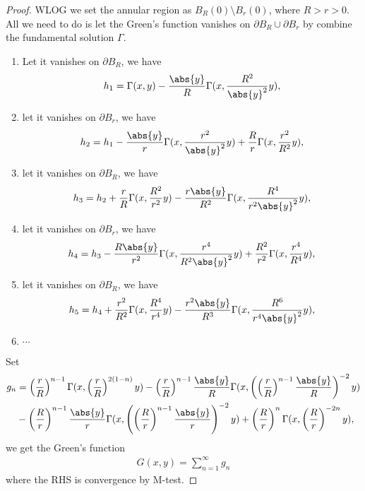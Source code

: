 \documentclass[a4paper]{article}
\DeclarePairedDelimiter{\abs}\lvert\rvert
\begin{document}
\begin{proof}
WLOG we set the annular region as $B_{R}(0)\setminus B_r(0)$, where $R>r>0$.
All we need to do is let the Green's function vanishes on $\partial B_R\cup\partial B_r$
by combine the fundamental solution $\Gamma$.
\begin{enumerate}
\item Let it vanishes on $\partial B_R$, we have
\begin{align*}
h_1 = \Gamma(x,y) - \frac{\abs{y}}{R}\Gamma(x,\frac{R^2}{\abs{y}^2}y),
\end{align*}
\item let it vanishes on $\partial B_r$, we have
\begin{align*}
h_2 = h_1 - \frac{\abs{y}}{r}\Gamma(x,\frac{r^2}{\abs{y}^2}y) + \frac{R}{r}\Gamma(x,\frac{r^2}{R^2}y),
\end{align*}
\item let it vanishes on $\partial B_R$, we have
\begin{align*}
h_3 = h_2 + \frac{r}{R}\Gamma(x,\frac{R^2}{r^2}y) - \frac{r\abs{y}}{R^2}\Gamma(x,\frac{R^4}{r^2\abs{y}^2}y),
\end{align*}
\item let it vanishes on $\partial B_r$, we have
\begin{align*}
h_4 = h_3 - \frac{R\abs{y}}{r^2}\Gamma(x,\frac{r^4}{R^2\abs{y}^2}y) + \frac{R^2}{r^2}\Gamma(x,\frac{r^4}{R^4}y),
\end{align*}
\item let it vanishes on $\partial B_R$, we have
\begin{align*}
h_5 = h_4 + \frac{r^2}{R^2}\Gamma(x,\frac{R^4}{r^4}y) - \frac{r^2\abs{y}}{R^3}\Gamma(x,\frac{R^6}{r^4\abs{y}^2}y),
\end{align*}
\item $\cdots$
\end{enumerate}
Set
\begin{align*}
g_n &= \left(\frac{r}{R}\right)^{n-1}\Gamma(x,\left(\frac{r}{R}\right)^{2(1-n)}y)
- \left(\frac{r}{R}\right)^{n-1}\frac{\abs{y}}{R}\Gamma(x, \left(\left(\frac{r}{R}\right)^{n-1}\frac{\abs{y}}{R}\right)^{-2}y) \\
&- \left(\frac{R}{r}\right)^{n-1}\frac{\abs{y}}{r}\Gamma(x, \left(\left(\frac{R}{r}\right)^{n-1}\frac{\abs{y}}{r}\right)^{-2}y)
+ \left(\frac{R}{r}\right)^{n}\Gamma(x,\left(\frac{R}{r}\right)^{-2n}y),
\end{align*}
we get the Green's function
\begin{align*}
G(x,y) = \sum_{n=1}^\infty g_n
\end{align*}
where the RHS is convergence by M-test.
\end{proof}
\end{document}
